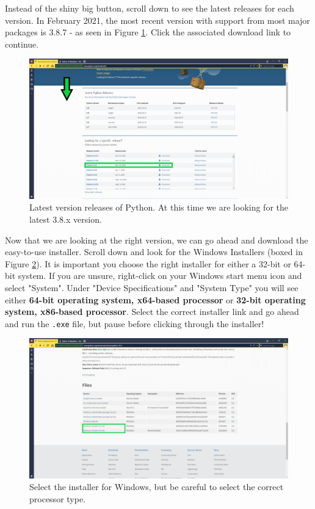 \documentclass[oneside]{book}
\begin{document}
\FloatBarrier

Instead of the shiny big button, scroll down to see the latest releases for each version. In February 2021, the most recent version with support from most major packages is 3.8.7 - as seen in Figure \ref{fig:pyDownloadVersions}. Click the associated download link to continue.

\begin{figure}[H]
\centering
\includegraphics[width=0.7\linewidth]{./img/pyDownloadVersion.PNG}
\caption{Latest version releases of Python. At this time we are looking for the latest 3.8.x version.}
\label{fig:pyDownloadVersions}
\end{figure}

\FloatBarrier

Now that we are looking at the right version, we can go ahead and download the easy-to-use installer. Scroll down and look for the Windows Installers (boxed in Figure \ref{fig:pyInstallSelect}). It is important you choose the right installer for either a 32-bit or 64-bit system. If you are unsure, right-click on your Windows start menu icon and select "System". Under "Device Specifications" and "System Type" you will see either \textbf{64-bit operating system, x64-based processor} or \textbf{32-bit operating system, x86-based processor}. Select the correct installer link and go ahead and run the \texttt{.exe} file, but pause before clicking through the installer!

\begin{figure}[H]
\centering
\includegraphics[width=0.7\linewidth]{./img/pyDownloadOS.PNG}
\caption{Select the installer for Windows, but be careful to select the correct processor type.}
\label{fig:pyInstallSelect}
\end{figure}
\end{document}
